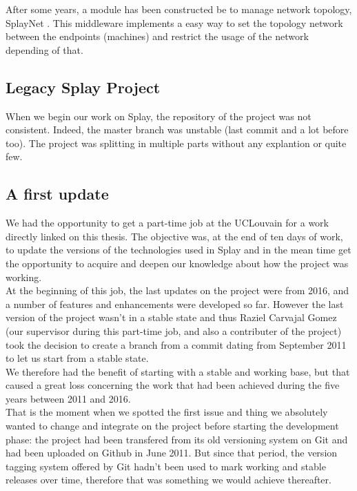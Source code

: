 \documentclass{eplmastersthesis}
\begin{document}
      After some years, a module has been constructed be to manage network
      topology, SplayNet \cite{SplayNet}. This middleware implements a easy
      way to set the topology network between the endpoints (machines) and
      restrict the usage of the network depending of that.

      \subsection{Legacy Splay Project}

        When we begin our work on Splay, the repository of the
        project \cite{SplayGit} was not consistent. Indeed, the master branch was
        unstable (last commit and a lot before too). The project was splitting in
        multiple parts without any explantion or quite few.

      \subsection{A first update}


        We had the opportunity to get a part-time job at the UCLouvain for
        a work directly linked on this thesis. The objective was, at the end
        of ten days of work, to update the versions of the technologies used
        in Splay and in the mean time get the opportunity to acquire and
        deepen our knowledge about how the project was working.\\

        At the beginning of this job, the last updates on the project were
        from 2016, and a number of features and enhancements were developed
        so far. However the last version of the project wasn't in a stable
        state and thus Raziel Carvajal Gomez (our supervisor during this
        part-time job, and also a contributer of the project) took the decision
        to create a branch from a commit dating from September 2011 to let us
        start from a stable state.\\
        We therefore had the benefit of starting with a stable and working
        base, but that caused a great loss concerning the work that had been
        achieved during the five years between 2011 and 2016.\\
        That is the moment when we spotted the first issue and thing we
        absolutely wanted to change and integrate on the project before
        starting the development phase: the project had been transfered from
        its old versioning system on Git and had been uploaded on Github in
        June 2011. But since that period, the version tagging system offered
        by Git hadn't been used to mark working and stable releases over time,
        therefore that was something we would achieve thereafter.\\
\end{document}
